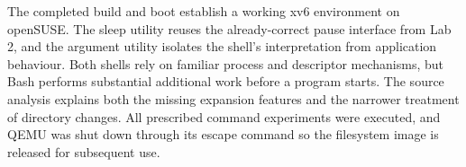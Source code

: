 \documentclass{../latex/utmreport}
\begin{document}
\utmconclusions
The completed build and boot establish a working xv6 environment on openSUSE.
The sleep utility reuses the already-correct pause interface from Lab 2, and the
argument utility isolates the shell's interpretation from application behaviour.
Both shells rely on familiar process and descriptor mechanisms, but Bash performs
substantial additional work before a program starts. The source analysis explains
both the missing expansion features and the narrower treatment of directory changes.
All prescribed command experiments were executed, and QEMU was shut down through
its escape command so the filesystem image is released for subsequent use.
\end{document}
